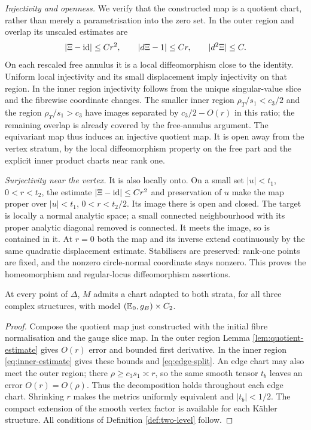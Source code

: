 \emph{Injectivity and openness.}
We verify that the constructed map is a quotient chart, rather
than merely a parametrisation into the zero set. In the outer region and
overlap its unscaled estimates are
\[
 |\Xi-\mathrm{id}|\le Cr^2,\qquad |d\Xi-1|\le Cr,
 \qquad |d^2\Xi|\le C.
\]
On each rescaled free annulus it is a local diffeomorphism close
to the identity. Uniform local injectivity and its small
displacement imply injectivity on that region. In the inner
region injectivity follows from the unique singular-value slice
and the fibrewise coordinate changes. The smaller inner region
$\rho_T/s_1<c_3/2$ and the region $\rho_T/s_1>c_3$ have
images separated by $c_3/2-O(r)$ in this ratio; the remaining
overlap is already covered by the free-annulus argument. The
equivariant map thus induces an injective quotient map. It is
open away from the vertex stratum, by the local diffeomorphism
property on the free part and the explicit inner product charts
near rank one.

\emph{Surjectivity near the vertex.}
It is also locally onto. On a small set
$|u|<t_1$, $0<r<t_2$, the estimate $|\Xi-\mathrm{id}|\le Cr^2$
and preservation of $u$ make the map proper over
$|u|<t_1$, $0<r<t_2/2$. Its image there is open and closed.
The target is locally a normal analytic space; a small connected
neighbourhood with its proper analytic diagonal removed is
connected. It meets the image, so is contained in it. At $r=0$
both the map and its inverse extend continuously by the same
quadratic displacement estimate. Stabilisers are preserved:
rank-one points are fixed, and the nonzero circle-normal
coordinate stays nonzero. This proves the homeomorphism and
regular-locus diffeomorphism assertions.

\begin{theorem}\label{thm:diagonal-chart}
At every point of $\Delta$, $M$ admits a chart adapted to both
strata, for all three complex structures, with model
$(\mathbb E_0,g_B)\times C_2$.
\end{theorem}
\begin{proof}
Compose the quotient map just constructed with the initial fibre
normalisation and the gauge slice map. In the outer region
Lemma \ref{lem:quotient-estimate} gives $O(r)$ error and
bounded first derivative. In the inner region
\eqref{eq:inner-estimate} gives these bounds and
\eqref{eq:edge-split}. An edge chart may also meet the outer
region; there $\rho\ge c_3s_1\asymp r$, so the same smooth
tensor $t_b$ leaves an error $O(r)=O(\rho)$. Thus the
decomposition holds throughout each edge chart. Shrinking $r$
makes the metrics uniformly equivalent and $|t_b|<1/2$.
The compact extension of the smooth vertex factor is available
for each K\"ahler structure. All conditions of Definition
\ref{def:two-level} follow.
\end{proof}

